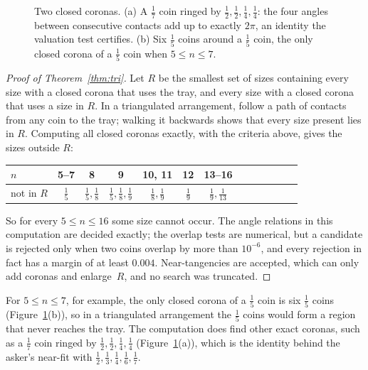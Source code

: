 \documentclass[11pt]{amsart}
\theoremstyle{remark}
\begin{document}
\begin{figure}[ht]
\centering
\begin{tikzpicture}
  
\end{tikzpicture}
\caption{Two closed coronas. (a) A $\frac17$ coin ringed by $\frac12,\frac12,\frac14,\frac14$: the four angles between consecutive contacts add up to exactly $2\pi$, an identity the valuation test certifies. (b) Six $\frac15$ coins around a $\frac15$ coin, the only closed corona of a $\frac15$ coin when $5\le n\le7$.}
\label{fig:corona}
\end{figure}

\begin{proof}[Proof of Theorem~\ref{thm:tri}]
Let $R$ be the smallest set of sizes containing every size with a closed corona that uses the tray, and every size with a closed corona that uses a size in $R$. In a triangulated arrangement, follow a path of contacts from any coin to the tray; walking it backwards shows that every size present lies in $R$. Computing all closed coronas exactly, with the criteria above, gives the sizes outside $R$:
\begin{center}
\begin{tabular}{lcccccccccccc}
\toprule
$n$ & 5--7 & 8 & 9 & 10, 11 & 12 & 13--16\\
\midrule
not in $R$ & $\frac15$ & $\frac15,\frac18$ & $\frac15,\frac18,\frac19$ & $\frac18,\frac19$ & $\frac19$ & $\frac19,\frac1{13}$\\
\bottomrule
\end{tabular}
\end{center}
So for every $5\le n\le16$ some size cannot occur. The angle relations in this computation are decided exactly; the overlap tests are numerical, but a candidate is rejected only when two coins overlap by more than $10^{-6}$, and every rejection in fact has a margin of at least $0.004$. Near-tangencies are accepted, which can only add coronas and enlarge~$R$, and no search was truncated.
\end{proof}

For $5\le n\le7$, for example, the only closed corona of a $\frac15$ coin is six $\frac15$ coins (Figure~\ref{fig:corona}(b)), so in a triangulated arrangement the $\frac15$ coins would form a region that never reaches the tray. The computation does find other exact coronas, such as a $\frac17$ coin ringed by $\frac12,\frac12,\frac14,\frac14$ (Figure~\ref{fig:corona}(a)), which is the identity behind the asker's near-fit with $\frac12,\frac13,\frac14,\frac16,\frac17$.
\end{document}
